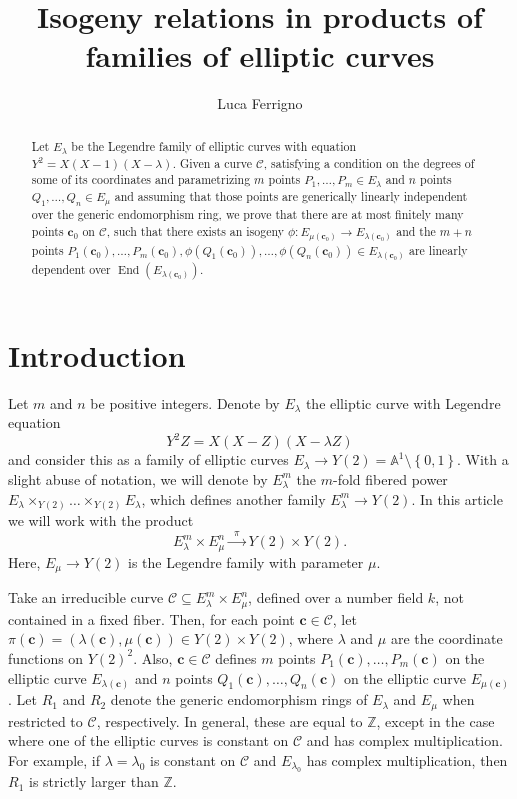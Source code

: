 \documentclass[11pt,a4paper,reqno]{amsart}
\author[L. Ferrigno]{Luca Ferrigno}
\title{Isogeny relations in products of families of elliptic curves}
\numberwithin{equation}{section}
\newcommand{\Z}{\mathbb{Z}}
\newcommand{\A}{\mathbb{A}}
\renewcommand{\c}{\mathcal{C}}
\newcommand{\cc}{\mathbf{c}}
\renewcommand{\l}{\lambda}
\newcommand{\m}{\mu}
\newcommand{\pg}[1]{\left\lbrace #1 \right\rbrace}
\DeclareMathOperator{\en}{End}
\theoremstyle{remark}
\theoremstyle{definition}
\theoremstyle{definition}
\begin{document}
\begin{abstract}
Let $E_{\l}$ be the Legendre family of elliptic curves with equation $Y^2=X(X-1)(X-\l)$. Given a curve $\c$, satisfying a condition on the degrees of some of its coordinates and parametrizing $m$ points $P_1, \ldots, P_m \in E_{\l}$ and $n$ points $Q_1, \ldots, Q_n \in E_{\m}$ and assuming that those points are generically linearly independent over the generic endomorphism ring, we prove that there are at most finitely many points $\cc_0$ on $\c$, such that there exists an isogeny $\phi: E_{\m(\cc_0)} \rightarrow E_{\l(\cc_0)}$ and the $m+n$ points $P_1(\cc_0), \ldots, P_m(\cc_0), \phi(Q_1(\cc_0)), \ldots, \phi(Q_n(\cc_0)) \in E_{\l(\cc_0)}$ are linearly dependent over $\en(E_{\l(\cc_0)})$.
\end{abstract}
\maketitle

\tableofcontents

\section{Introduction}
Let $m$ and $n$ be positive integers. Denote by $E_{\l}$ the elliptic curve with Legendre equation
$$Y^2Z=X(X-Z)(X-\l Z)$$ 
and consider this as a family of elliptic curves $E_{\l} \rightarrow Y(2)=\A^1 \setminus \pg{0,1}$. With a slight abuse of notation, we will denote by $E_{\l}^m$ the $m$-fold fibered power $E_{\l}\times_{Y(2)} \ldots \times_{Y(2)} E_{\l}$, which defines another family $E_{\l}^m \rightarrow Y(2)$. In this article we will work with the product 
$$E_{\l}^m \times E_{\m}^n \xrightarrow{\enspace\pi\enspace} Y(2) \times Y(2).$$
Here, $E_{\m} \rightarrow Y(2)$ is the Legendre family with parameter $\m$. 

Take an irreducible curve $\c \subseteq E_{\l}^m \times E_{\m}^n$, defined over a number field $k$, not contained in a fixed fiber. Then, for each point $\cc \in \c$, let $\pi(\cc)=(\l(\cc), \m(\cc)) \in Y(2) \times Y(2)$, where $\l$ and $\m$ are the coordinate functions on $Y(2)^2$. Also, $\cc \in \c$ defines $m$ points $P_1(\cc), \ldots, P_m(\cc)$ on the elliptic curve $E_{\l(\cc)}$ and $n$ points $Q_1(\cc), \ldots, Q_n(\cc)$ on the elliptic curve $E_{\m(\cc)}$. Let $R_1$ and $R_2$ denote the generic endomorphism rings of $E_{\l}$ and $E_{\m}$ when restricted to $\c$, respectively. In general, these are equal to $\Z$, except in the case where one of the elliptic curves is constant on $\c$ and has complex multiplication.  
For example, if $\l = \l_0$ is constant on $\c$ and $E_{\l_0}$ has complex multiplication, then $R_1$ is strictly larger than $\Z$.
\end{document}
